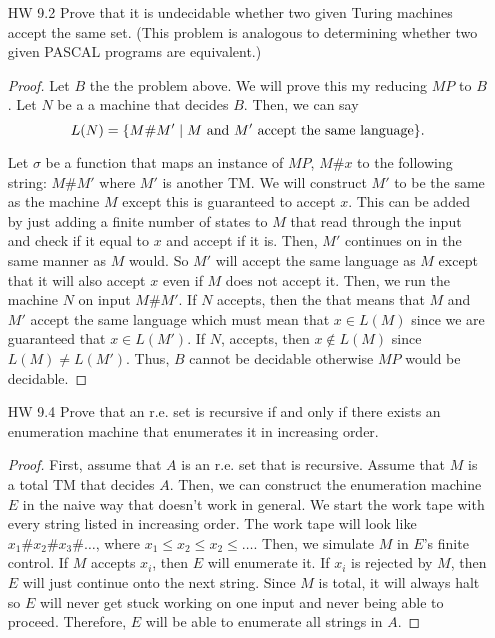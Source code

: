 \documentclass{article}
\newcommand{\ifff}{if and only if }
\newcommand{\setst}{\hspace{1mm} | \hspace{1mm} }
\theoremstyle{definition}
\begin{document}
\begin{enumerate}
\begin{proof}
		Then, we can use our machine $N$ on the input $M'\#y\#a$. If $N$ accepts, that means that $M'$ reached state $a$ on input $y$ which means that $M$ halted on $x$. If $N$ rejects, that means that $M'$ never reached the accept state on input $y$ which means that $M$ did not halt on $x$. Thus, $N$ can not be decidable since it could be used to solve the Halting Problem if it were. 
	\end{proof}
	\item[HW 9.2] Prove that it is undecidable whether two given Turing machines accept
	the same set. (This problem is analogous to determining whether two
	given PASCAL programs are equivalent.)
	\begin{proof}
		Let $B$ the the problem above. We will prove this my reducing $MP$ to $B$. Let $N$ be a a machine that decides $B$. Then, we can say
		\[L(N) = \{M\#M' \setst M \text{ and } M' \text{ accept the same language}\}.\]
		
		Let $\sigma$ be a function that maps an instance of $MP$, $M\#x$ to the following string: $M\#M'$ where $M'$ is another TM. We will construct $M'$ to be the same as the machine $M$ except this is guaranteed to accept $x$. This can be added by just adding a finite number of states to $M$ that read through the input and check if it equal to $x$ and accept if it is. Then, $M'$ continues on in the same manner as $M$ would. So $M'$ will accept the same language as $M$ except that it will also accept $x$ even if $M$ does not accept it. Then, we run the machine $N$ on input $M\#M'$. If $N$ accepts, then the that means that $M$ and $M'$ accept the same language which must mean that $x \in L(M)$ since we are guaranteed that $x \in L(M')$. If $N$, accepts, then $x \not\in L(M)$ since $L(M) \neq L(M')$. Thus, $B$ cannot be decidable otherwise $MP$ would be decidable. 
	\end{proof}
	\item[HW 9.4] Prove that an r.e. set is recursive \ifff there exists an enumeration
	machine that enumerates it in increasing order.
	\begin{proof}
		First, assume that $A$ is an r.e. set that is recursive. Assume that $M$ is a total TM that decides $A$. Then, we can construct the enumeration machine $E$ in the naive way that doesn't work in general. We start the work tape with every string listed in increasing order. The work tape will look like $x_1\#x_2\#x_3\#\ldots$, where $x_1 \leq x_2 \leq x_2 \leq \ldots$. Then, we simulate $M$ in $E$'s finite control. If $M$ accepts $x_i$, then $E$ will enumerate it. If $x_i$ is rejected by $M$, then $E$ will just continue onto the next string. Since $M$ is total, it will always halt so $E$ will never get stuck working on one input and never being able to proceed. Therefore, $E$ will be able to enumerate all strings in $A$. 
		

\end{proof}
\end{enumerate}
\end{document}
